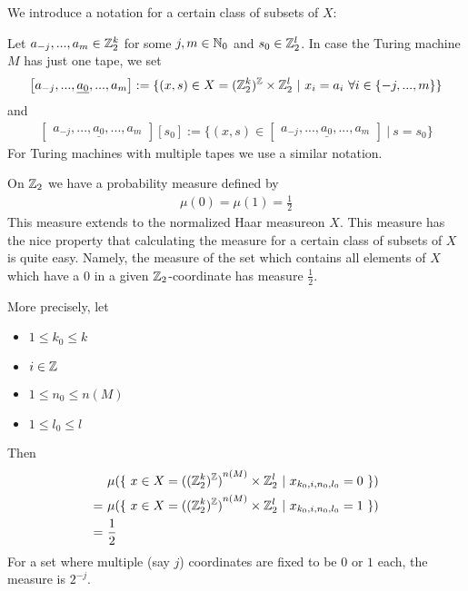 \begin{Notation}
	We introduce a notation for a certain class of subsets of $X$:

	Let $a_{-j},...,a_{m} \in \mathbb{Z}_2^k$ for some $j, m \in \mathbb{N}_0$ and $s_0 \in \mathbb{Z}_2^l$. In case the Turing machine $M$ has just one tape, we set
	\begin{align*}
		\begin{bmatrix}
			a_{-j},...,\underline{a_0},...,a_m
		\end{bmatrix} := \{ (x,s) \in X = (\mathbb{Z}_2^k)^{\mathbb{Z}} \times \mathbb{Z}_2^l ~|~ x_i = a_i ~\forall i \in \{-j,...,m\}\} 
	\end{align*}
	and
	\begin{align*}
		\begin{bmatrix}
			a_{-j},...,\underline{a_0},...,a_m
		\end{bmatrix} [ s_0 ] := \{ (x,s) \in \begin{bmatrix} a_{-j},...,\underline{a_0},...,a_m \end{bmatrix} ~|~ s = s_0 \}
	\end{align*}
	For Turing machines with multiple tapes we use a similar notation.
\end{Notation}

On $\mathbb{Z}_2$ we have a probability measure defined by
\begin{align*}
	\mu(0) = \mu(1) = \frac12
\end{align*}
This measure extends to the normalized Haar measure\footnotemark on $X$.
This measure has the nice property that calculating the measure for a certain class of subsets of $X$ is quite easy.
Namely, the measure of the set which contains all elements of $X$ which have a $0$ in a given $\mathbb{Z}_2$-coordinate has measure $\frac12$.

More precisely, let
\begin{itemize}
	\item $1 \leq k_0 \leq k$
	\item $i \in \mathbb{Z}$
	\item $1 \leq n_0 \leq n(M)$
	\item $1 \leq l_0 \leq l$
\end{itemize}
Then
\begin{align*}
	  &\mu (\{~ x \in X = {{((\mathbb{Z}_2^{k})^{\mathbb{Z}})}^{n(M)}} \times \mathbb{Z}_2^l ~|~ x_{k_0,i,n_0,l_0} = 0 ~\}) \\
	=~&\mu (\{~ x \in X = {{((\mathbb{Z}_2^{k})^{\mathbb{Z}})}^{n(M)}} \times \mathbb{Z}_2^l ~|~ x_{k_0,i,n_0,l_0} = 1 ~\}) \\
	=~&\frac12
\end{align*}
For a set where multiple (say $j$) coordinates are fixed to be $0$ or $1$ each, the measure is $2^{-j}$.

